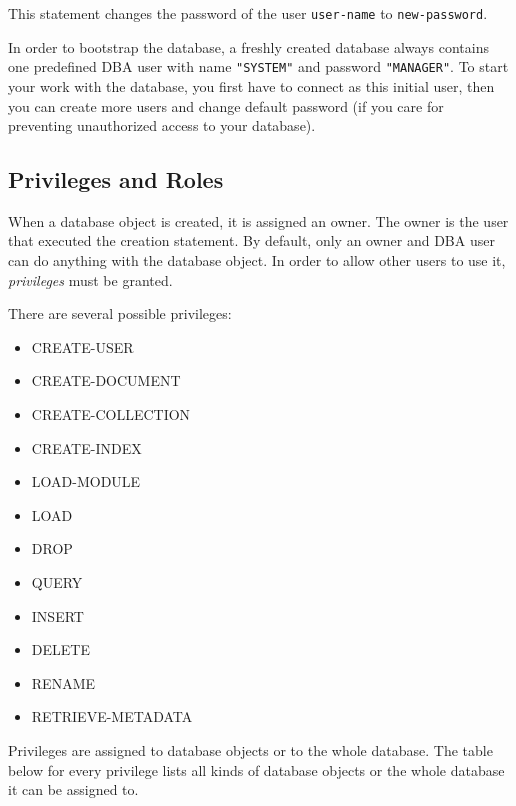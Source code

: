 \documentclass[a4paper,12pt]{article}
\begin{document}
This statement changes the password of the user \verb!user-name! to \verb!new-password!.

In order to bootstrap the database, a freshly created database always contains one predefined DBA user with name \verb!"SYSTEM"! and password \verb!"MANAGER"!. To start your work with the database, you first have to connect as this initial user, then you can create more users and change default password (if you care for preventing unauthorized access to your database).

\subsection{Privileges and Roles}
\label{roles}

When a database object is created, it is assigned an owner. The owner is the user that executed the creation statement. By default, only an owner and DBA user can do anything with the database object. In order to allow other users to use it, \emph{privileges} must be granted.

There are several possible privileges: 
\begin{itemize}
\item CREATE-USER
\item CREATE-DOCUMENT
\item CREATE-COLLECTION
\item CREATE-INDEX
\item LOAD-MODULE
\item LOAD
\item DROP
\item QUERY
\item INSERT
\item DELETE
\item RENAME
\item RETRIEVE-METADATA
\end{itemize}

Privileges are assigned to database objects or to the whole database. The table below for every privilege lists all kinds of database objects or the whole database it can be assigned to.
\end{document}

